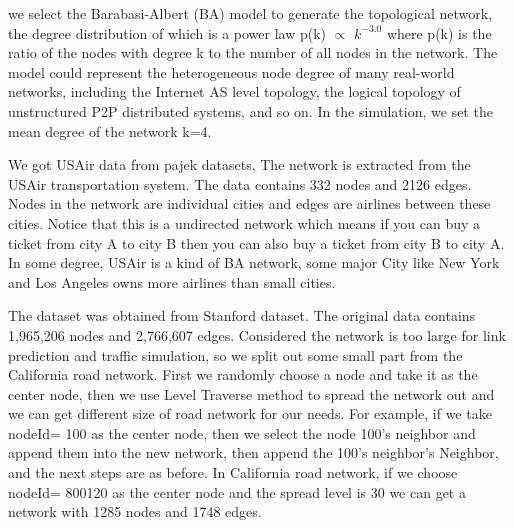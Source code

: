 \documentclass[onecolumn,preprintnumbers,amsmath,amssymb]{revtex4}
\begin{document}

we select the Barabasi-Albert (BA)\cite{BA} model to generate the topological network, the degree distribution of which is a power law p(k) $\propto$ $k^{-3.0}$ where p(k) is the ratio of the nodes with degree k to the number of all nodes in the network. The model could represent the heterogeneous node degree of many real-world networks, including the Internet AS level topology, the logical topology of unstructured P2P distributed systems, and so on. In the simulation, we set the mean degree of the network k=4.


We got USAir data from pajek datasets, The network is extracted from the USAir transportation system. The data contains 332 nodes and 2126 edges. Nodes in the network are individual cities and edges are airlines between these cities. Notice that this is a undirected network which means if you can buy a ticket from city A to city B then you can also buy a ticket from city B to city A. In some degree, USAir is a kind of BA network, some major City like New York and Los Angeles owns more airlines than small cities.


The dataset was obtained from Stanford dataset. The original data contains 1,965,206 nodes and 2,766,607 edges. Considered the network is too large for link prediction and traffic simulation, so we split out some small part from the California road network. First we randomly choose a node and take it as the center node, then we use Level Traverse method to spread the network out and we can get different size of road network for our needs. For example, if we take nodeId= 100 as the center node, then we select the node 100’s neighbor and append them into the new network, then append the 100’s neighbor’s Neighbor, and the next steps are as before. In California road network, if we choose nodeId= 800120 as the center node and the spread level is 30 we can get a network with 1285 nodes and 1748 edges.

\end{document}
